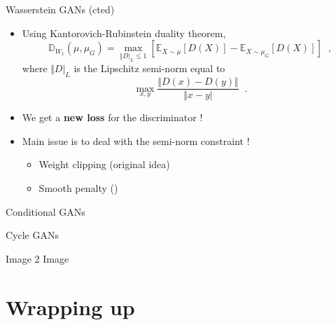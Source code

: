 \documentclass{beamer}
\begin{document}
\begin{frame}{Wasserstein GANs (cted)}
    \begin{itemize}
        \item Using \textcolor{cOrange}{Kantorovich-Rubinstein duality theorem},
        \[ \mathbb{D}_{W_1}(\mu, \mu_G) = \mathop{max}_{\Vert D \vert_L \leq 1} \left[ \mathbb{E}_{X\sim \mu}\left[ D(X) \right] - \mathbb{E}_{X\sim \mu_G}\left[ D(X) \right] \right] \;\;, \]
        where $\Vert D \vert_L$ is the \textcolor{cOrange}{Lipschitz semi-norm} equal to
        \[ \mathop{max}_{x,y} \frac{\Vert D(x)-D(y) \Vert }{\Vert x-y \vert} \;\;. \]
        \item We get a \textcolor{cBlue}{\textbf{new loss}} for the discriminator !
        \item Main issue is to deal with the semi-norm constraint !
        \begin{itemize}
            \item Weight clipping (original idea)
            \item Smooth penalty (\cite{iwgan})
        \end{itemize} 
    \end{itemize}
\end{frame}

\begin{frame}{Conditional GANs}
    
\end{frame}

\begin{frame}{Cycle GANs}
    
\end{frame}

\begin{frame}{Image 2 Image}
    
\end{frame}


\section{Wrapping up}
\end{document}
